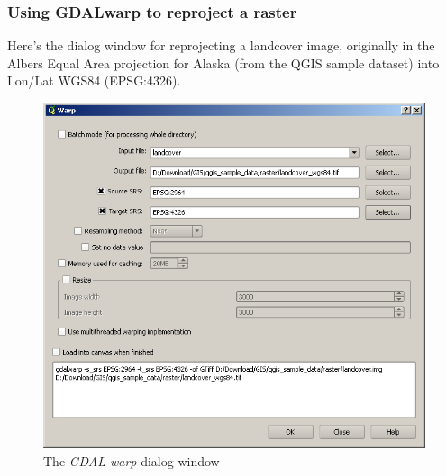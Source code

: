 \subsubsection{Using GDALwarp to reproject a raster}
Here's the dialog window for reprojecting a landcover image, originally in the Albers Equal Area projection for Alaska (from the QGIS sample dataset) into Lon/Lat WGS84 (EPSG:4326).
\begin{figure}[ht]
   \centering
   \caption{\label{gdalwarp} The \emph{GDAL warp} dialog window \nixcaption}
   \includegraphics[clip=true, width=12cm]{plugins_gdaltools_images/gdalwarp}
\end{figure}

\FloatBarrier
